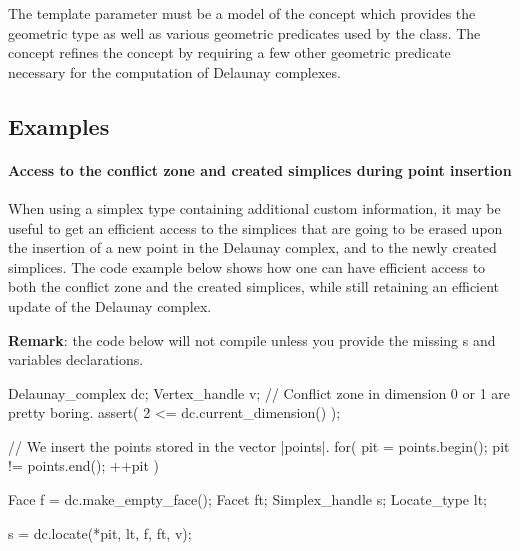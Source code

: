 {The template parameter  must be a model of the concept
 which provides the geometric  type as
well as various geometric predicates used by the  class.
The concept  refines the concept
 by requiring a few other geometric predicate necessary
for the computation of Delaunay complexes.


\subsection{Examples}

\paragraph{Access to the conflict zone and created simplices during point
insertion}

When using a simplex type containing additional custom information, it may be
useful to get an efficient access to the simplices that are going to be erased
upon the insertion of a new point in the Delaunay complex, and to the newly
created simplices. The code example below shows how one can have efficient
access to both the conflict zone and the created simplices, while still
retaining an efficient update of the Delaunay complex.

\textbf{Remark}: the code below will not compile unless you provide the
missing s and variables declarations.

\begin{ccExampleCode}
Delaunay_complex dc;
Vertex_handle v;
// Conflict zone in dimension 0 or 1 are pretty boring.
assert( 2 <= dc.current_dimension() );

// We insert the points stored in the vector |points|.
for( pit = points.begin(); pit != points.end(); ++pit )
{
    Face           f = dc.make_empty_face();
    Facet          ft;
    Simplex_handle s;
    Locate_type    lt;

    s = dc.locate(*pit, lt, f, ft, v);

}
\end{ccExampleCode}}
